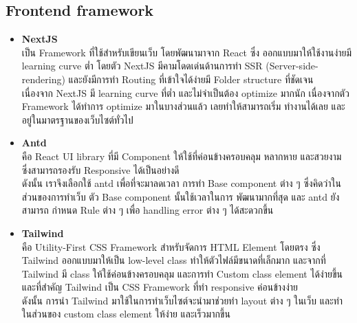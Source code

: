 \documentclass[12pt,oneside,openright,a4paper]{cpe-thai-project}
\begin{document}
\subsection{Frontend framework}
\begin{itemize}
  \item \textbf{NextJS} \\
\hspace*{1cm} เป็น Framework ที่ใช้สำหรับเขียนเว็บ โดยพัฒนามาจาก React ซึ่ง ออกแบบมาให้ใช้งานง่ายมี learning curve ต่ำ โดยตัว NextJS มีคามโดดเด่นด้านการทำ SSR (Server-side-rendering) และยังมีการทำ Routing ที่เข้าใจได้ง่ายมี Folder structure ที่ชัดเจน  \\
\hspace*{1cm} เนื่องจาก NextJS มี learning curve ที่ต่ำ และไม่จำเป็นต้อง optimize มากนัก เนื่องจากตัว Framework ได้ทำการ optimize มาในบางส่วนแล้ว เลยทำให้สามารถเริ่ม ทำงานได้เลย และอยู่ในมาตรฐานของเว็บไซต์ทั่วไป \cite{WhaiIsNextJS}
  \item \textbf{Antd} \\
\hspace*{1cm} คือ React UI library ที่มี  Component ให้ใช้ที่ค่อนข้างครอบคลุม หลากหาย และสวยงาม ซึ่งสามารถรองรับ Responsive ได้เป็นอย่างดี \\
\hspace*{1cm} ดังนั้น เราจึงเลือกใช้ antd เพื่อที่จะมาลดเวลา การทำ Base component ต่าง ๆ ซึ่งคิดว่าในส่วนของการทำเว็บ ตัว Base component นั้นใช้เวลาในการ พัฒนามากที่สุด และ antd ยังสามารถ กำหนด Rule ต่าง ๆ เพื่อ handling error ต่าง ๆ ได้สะดวกขึ้น \cite{WhaiIsAntd}
  \item \textbf{Tailwind} \\
\hspace*{1cm} คือ Utility-First CSS Framework สำหรับจัดการ HTML Element โดยตรง ซึ่ง Tailwind ออกแบบมาให้เป็น low-level class ทำให้ตัวไฟล์มีขนาดที่เล็กมาก และจากที่ Tailwind มี class ให้ใช้ค่อนข้างครอบคลุม และการทำ Custom class element ได้ง่ายขึ้น และที่สำคัญ Tailwind เป็น CSS Framework ที่ทำ responsive ค่อนข้างง่าย \\
\hspace*{1cm} ดังนั้น การนำ Tailwind มาใช้ในการทำเว็บไซต์จะนำมาช่วยทำ layout ต่าง ๆ ในเว็บ และทำในส่วนของ custom class element ให้ง่าย และเร็วมากขึ้น \cite{WhaiIsTailwind}
\end{itemize}
\end{document}
